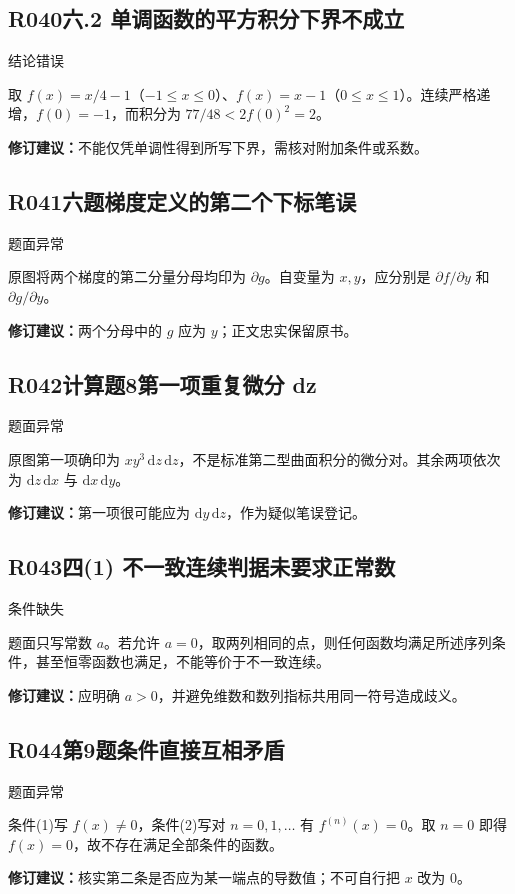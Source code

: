 \subsection*{R040\quad 六.2 单调函数的平方积分下界不成立}
\noindent{}\quad 结论错误\par
取 $f(x)=x/4-1$（$-1\le x\le0$）、$f(x)=x-1$（$0\le x\le1$）。连续严格递增，$f(0)=-1$，而积分为 $77/48<2f(0)^2=2$。
\par\textbf{修订建议：}不能仅凭单调性得到所写下界，需核对附加条件或系数。\par
{}
\subsection*{R041\quad 六题梯度定义的第二个下标笔误}
\noindent{}\quad 题面异常\par
原图将两个梯度的第二分量分母均印为 $\partial g$。自变量为 $x,y$，应分别是 $\partial f/\partial y$ 和 $\partial g/\partial y$。
\par\textbf{修订建议：}两个分母中的 $g$ 应为 $y$；正文忠实保留原书。\par
{}
\subsection*{R042\quad 计算题8第一项重复微分 dz}
\noindent{}\quad 题面异常\par
原图第一项确印为 $xy^3\,\mathrm dz\,\mathrm dz$，不是标准第二型曲面积分的微分对。其余两项依次为 $\mathrm dz\,\mathrm dx$ 与 $\mathrm dx\,\mathrm dy$。
\par\textbf{修订建议：}第一项很可能应为 $\mathrm dy\,\mathrm dz$，作为疑似笔误登记。\par
{}
\subsection*{R043\quad 四(1) 不一致连续判据未要求正常数}
\noindent{}\quad 条件缺失\par
题面只写常数 $a$。若允许 $a=0$，取两列相同的点，则任何函数均满足所述序列条件，甚至恒零函数也满足，不能等价于不一致连续。
\par\textbf{修订建议：}应明确 $a>0$，并避免维数和数列指标共用同一符号造成歧义。\par
{}
\subsection*{R044\quad 第9题条件直接互相矛盾}
\noindent{}\quad 题面异常\par
条件(1)写 $f(x)\ne0$，条件(2)写对 $n=0,1,\ldots$ 有 $f^{(n)}(x)=0$。取 $n=0$ 即得 $f(x)=0$，故不存在满足全部条件的函数。
\par\textbf{修订建议：}核实第二条是否应为某一端点的导数值；不可自行把 $x$ 改为 $0$。\par
{}
